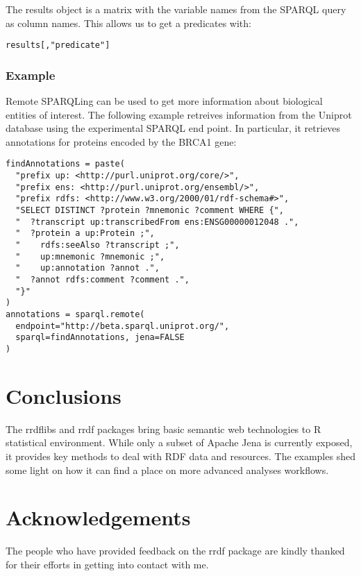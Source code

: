 \documentclass[12pt]{article}
\begin{document}
The results object is a matrix with the variable names from the SPARQL query as column names.
This allows us to get a predicates with:

\begin{footnotesize}
\begin{verbatim}
results[,"predicate"]
\end{verbatim}
\end{footnotesize}

\subsubsection{Example}

Remote SPARQLing can be used to get more information about biological entities of interest. The following
example retreives information from the Uniprot database using the experimental SPARQL end point. In
particular, it retrieves annotations for proteins encoded by the BRCA1 gene:

\begin{footnotesize}
\begin{verbatim}
findAnnotations = paste(
  "prefix up: <http://purl.uniprot.org/core/>",
  "prefix ens: <http://purl.uniprot.org/ensembl/>",
  "prefix rdfs: <http://www.w3.org/2000/01/rdf-schema#>",
  "SELECT DISTINCT ?protein ?mnemonic ?comment WHERE {",
  "  ?transcript up:transcribedFrom ens:ENSG00000012048 .",
  "  ?protein a up:Protein ;",
  "    rdfs:seeAlso ?transcript ;",
  "    up:mnemonic ?mnemonic ;",
  "    up:annotation ?annot .",
  "  ?annot rdfs:comment ?comment .",
  "}"
)
annotations = sparql.remote(
  endpoint="http://beta.sparql.uniprot.org/",
  sparql=findAnnotations, jena=FALSE
)
\end{verbatim}
\end{footnotesize}

\section{Conclusions}

The rrdflibs and rrdf packages bring basic semantic web technologies to R statistical environment.
While only a subset of Apache Jena is currently exposed, it provides key methods to deal with
RDF data and resources. The examples shed some light on how it can find a place on more advanced
analyses workflows.

\section{Acknowledgements}

The people who have provided feedback on the rrdf package are kindly thanked for their efforts in
getting into contact with me.

\printbibliography
\end{document}
